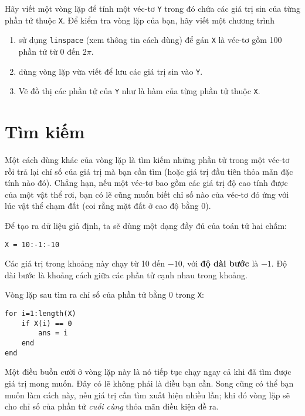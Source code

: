 \documentclass[12pt]{book}
\begin{document}
\begin{ex}
Hãy viết một vòng lặp để tính một véc-tơ {\tt Y} trong đó
chứa các giá trị sin của từng phần tử thuộc {\tt X}.  Để kiểm tra
vòng lặp của bạn, hãy viết một chương trình 

\begin{enumerate}

\item sử dụng {\tt linspace} (xem thông tin cách dùng) để gán
{\tt X} là véc-tơ gồm 100 phần tử từ 0 đến $2 \pi$.

\item dùng vòng lặp vừa viết để lưu các giá trị sin vào {\tt Y}.

\item Vẽ đồ thị các phần tử của {\tt Y} như là hàm của từng phần tử
thuộc {\tt X}.

\end{enumerate}
\end{ex}

\section{Tìm kiếm}
\label{search}

Một cách dùng khác của vòng lặp là tìm kiếm những phần tử trong
một véc-tơ rồi trả lại chỉ số của giá trị mà bạn cần tìm (hoặc
giá trị đầu tiên thỏa mãn đặc tính nào đó). Chẳng hạn, nếu một
véc-tơ bao gồm các giá trị độ cao tính được của một vật thể
rơi, bạn có lẽ cũng muốn biết chỉ số nào của véc-tơ đó ứng với
lúc vật thể chạm đất (coi rằng mặt đất ở cao độ bằng 0).

Để tạo ra dữ liệu giả định, ta sẽ dùng một dạng đầy đủ của 
toán tử hai chấm:

\begin{verbatim}
X = 10:-1:-10
\end{verbatim}

Các giá trị trong khoảng này chạy từ 10 đến $-10$, với 
{\bf độ dài bước} là $-1$. Độ dài bước là khoảng cách giữa các
phần tử cạnh nhau trong khoảng.

Vòng lặp sau tìm ra chỉ số của phần tử bằng 0 trong {\tt X}:

\begin{verbatim}
for i=1:length(X)
    if X(i) == 0
        ans = i
    end
end
\end{verbatim}

Một điều buồn cười ở vòng lặp này là nó tiếp tục chạy ngay cả khi
đã tìm được giá trị mong muốn. Đây có lẽ không phải là điều bạn
cần. Song cũng có thể bạn muốn làm cách này, nếu giá trị cần tìm
xuất hiện nhiều lần; khi đó vòng lặp sẽ cho chỉ số của phần tử
{\em cuối cùng} thỏa mãn điều kiện đề ra.
\end{document}
